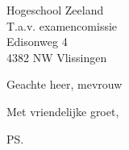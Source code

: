 \documentclass{letter}
\begin{document}
\begin{letter}{Hogeschool Zeeland \\ T.a.v. examencomissie \\ Edisonweg 4 \\ 4382 NW Vlissingen}

\opening{Geachte heer, mevrouw}

\closing{Met vriendelijke groet, }

\ps

\end{letter}
\end{document}
